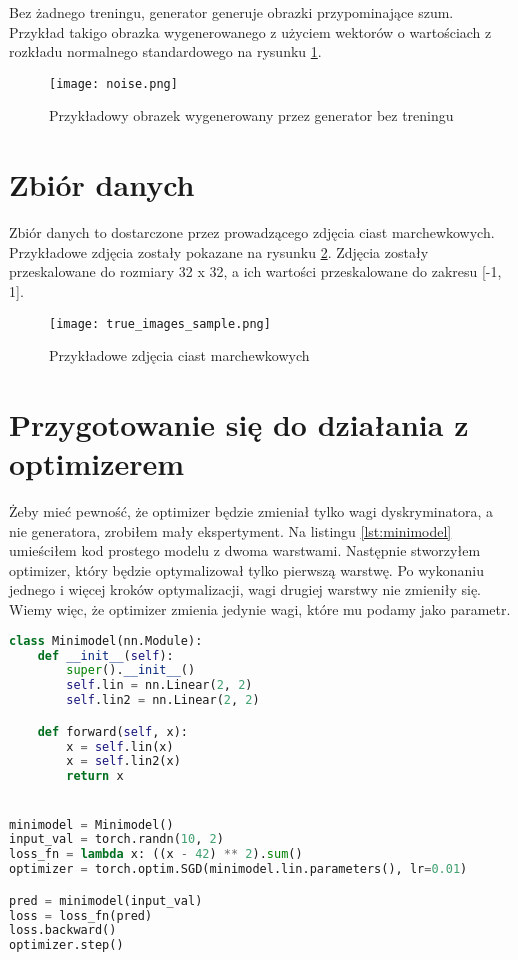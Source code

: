 \documentclass[a4paper]{article}
\begin{document}
Bez żadnego treningu, generator generuje obrazki przypominające szum. Przykład takigo obrazka wygenerowanego
z użyciem wektorów o wartościach z rozkładu normalnego standardowego na rysunku \ref{fig:noise}.

\begin{figure}[H]
    \centering
    \texttt{[image: noise.png]}
    \caption{Przykładowy obrazek wygenerowany przez generator bez treningu}
    \label{fig:noise}
\end{figure}


\section{Zbiór danych}

Zbiór danych to dostarczone przez prowadzącego zdjęcia ciast marchewkowych.
Przykładowe zdjęcia zostały pokazane na rysunku \ref{fig:true_images_sample}.
Zdjęcia zostały przeskalowane do rozmiary 32 x 32, a ich wartości
przeskalowane do zakresu [-1, 1].

\begin{figure}[H]
    \centering
    \texttt{[image: true\_images\_sample.png]}
    \caption{Przykładowe zdjęcia ciast marchewkowych}
    \label{fig:true_images_sample}
\end{figure}

\section{Przygotowanie się do działania z optimizerem}

Żeby mieć pewność, że optimizer będzie zmieniał tylko wagi dyskryminatora,
a nie generatora, zrobiłem mały ekspertyment. Na listingu \ref{lst:minimodel}
umieściłem kod prostego modelu z dwoma warstwami. Następnie stworzyłem
optimizer, który będzie optymalizował tylko pierwszą warstwę. Po wykonaniu
jednego i więcej kroków optymalizacji, wagi drugiej warstwy nie zmieniły się.
Wiemy więc, że optimizer zmienia jedynie wagi, które mu podamy jako parametr.

\begin{lstlisting}[language=python,label={lst:minimodel},caption={Eksperyment z optimizerem}]
class Minimodel(nn.Module):
    def __init__(self):
        super().__init__()
        self.lin = nn.Linear(2, 2)
        self.lin2 = nn.Linear(2, 2)

    def forward(self, x):
        x = self.lin(x)
        x = self.lin2(x)
        return x


minimodel = Minimodel()
input_val = torch.randn(10, 2)
loss_fn = lambda x: ((x - 42) ** 2).sum()
optimizer = torch.optim.SGD(minimodel.lin.parameters(), lr=0.01)

pred = minimodel(input_val)
loss = loss_fn(pred)
loss.backward()
optimizer.step()
\end{lstlisting}
\end{document}

